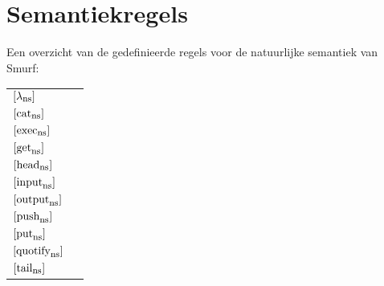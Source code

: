 \section{Semantiekregels}
\label{sec:app:rules}

Een overzicht van de gedefinieerde regels voor de natuurlijke semantiek van
Smurf:

\begin{framed}
	\printrulefalse
	\setlength{\extrarowheight}{20pt}
	\begin{tabular}{l l}
		$\rlambdans$  & \therlambdans{} \\
		$\rcatns$     & \thercatns{} \\
		$\rexecns$    & \therexecns{} \\
		$\rgetns$     & \thergetns{} \\
		$\rheadns$    & \therheadns{} \\
		$\rinputns$   & \therinputns{} \\
		$\routputns$  & \theroutputns{} \\
		$\rpushns$    & \therpushns{} \\
		$\rputns$     & \therputns{} \\
		$\rquotifyns$ & \therquotifyns{} \\
		$\rtailns$    & \thertailns{} \\
	\end{tabular}
	\vspace{1cm}
	\printruletrue
\end{framed}

\restoregeometry
